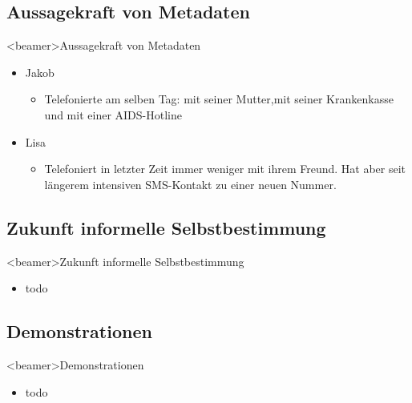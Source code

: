       \subsection*{Aussagekraft von Metadaten}
    \begin{frame}<beamer>{Aussagekraft von Metadaten}
      \begin{itemize}
        \item Jakob
           \begin{itemize}
         \item Telefonierte am selben Tag: mit seiner Mutter,mit seiner Krankenkasse und mit einer AIDS-Hotline
      \end{itemize}
        \item Lisa
           \begin{itemize}
         \item Telefoniert in letzter Zeit immer weniger mit ihrem Freund. Hat aber seit längerem intensiven SMS-Kontakt zu einer neuen Nummer.
      \end{itemize}
      \end{itemize}
    \end{frame}
    
    
    

  \subsection*{Zukunft informelle Selbstbestimmung}
    \begin{frame}<beamer>{Zukunft informelle Selbstbestimmung}
      \begin{itemize}
        \item
          todo
  

      \end{itemize}
    \end{frame}

  \subsection*{Demonstrationen}
    \begin{frame}<beamer>{Demonstrationen}
      \begin{itemize}
        \item
          todo
  
      \end{itemize}
    \end{frame}
